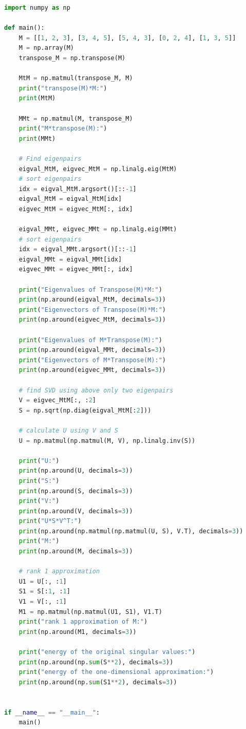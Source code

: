 \documentclass{article}
\begin{document}
\begin{lstlisting}[language=Python]
import numpy as np

def main():
    M = [[1, 2, 3], [3, 4, 5], [5, 4, 3], [0, 2, 4], [1, 3, 5]]
    M = np.array(M)
    transpose_M = np.transpose(M)

    MtM = np.matmul(transpose_M, M)
    print("transpose(M)*M:")
    print(MtM)

    MMt = np.matmul(M, transpose_M)
    print("M*transpose(M):")
    print(MMt)

    # Find eigenpairs
    eigval_MtM, eigvec_MtM = np.linalg.eig(MtM)
    # sort eigenpairs
    idx = eigval_MtM.argsort()[::-1]
    eigval_MtM = eigval_MtM[idx]
    eigvec_MtM = eigvec_MtM[:, idx]

    eigval_MMt, eigvec_MMt = np.linalg.eig(MMt)
    # sort eigenpairs
    idx = eigval_MMt.argsort()[::-1]
    eigval_MMt = eigval_MMt[idx]
    eigvec_MMt = eigvec_MMt[:, idx]

    print("Eigenvalues of Transpose(M)*M:")
    print(np.around(eigval_MtM, decimals=3))
    print("Eigenvectors of Transpose(M)*M:")
    print(np.around(eigvec_MtM, decimals=3))

    print("Eigenvalues of M*Transpose(M):")
    print(np.around(eigval_MMt, decimals=3))
    print("Eigenvectors of M*Transpose(M):")
    print(np.around(eigvec_MMt, decimals=3))

    # find SVD using above only two eigenpairs
    V = eigvec_MtM[:, :2]
    S = np.sqrt(np.diag(eigval_MtM[:2]))

    # calculate U using V and S
    U = np.matmul(np.matmul(M, V), np.linalg.inv(S))

    print("U:")
    print(np.around(U, decimals=3))
    print("S:")
    print(np.around(S, decimals=3))
    print("V:")
    print(np.around(V, decimals=3))
    print("U*S*V^T:")
    print(np.around(np.matmul(np.matmul(U, S), V.T), decimals=3))
    print("M:")
    print(np.around(M, decimals=3))

    # rank 1 approximation
    U1 = U[:, :1]
    S1 = S[:1, :1]
    V1 = V[:, :1]
    M1 = np.matmul(np.matmul(U1, S1), V1.T)
    print("rank 1 approximation of M:")
    print(np.around(M1, decimals=3))

    print("energy of the original singular values:")
    print(np.around(np.sum(S**2), decimals=3))
    print("energy of the one-dimensional approximation:")
    print(np.around(np.sum(S1**2), decimals=3))


if __name__ == "__main__":
    main()

\end{lstlisting}
\end{document}
